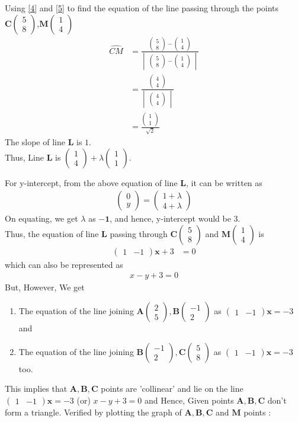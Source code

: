 \documentclass[journal,12pt,twocolumn]{IEEEtran}
\let\vec\mathbf
\newcommand{\mydet}[1]{\ensuremath{\begin{vmatrix}#1\end{vmatrix}}}
\newcommand{\myvec}[1]{\ensuremath{\begin{pmatrix}#1\end{pmatrix}}}
\begin{document}
\begin{enumerate}
Using \eqref{4} and \eqref{5} to find the equation of the line passing through the points $\vec{C}\myvec{5\\8}$,$\vec{M}\myvec{1\\4}$
\begin{align}
  \hat{CM} &= \frac{\myvec{5\\8} - \myvec{1\\4}}{\mydet{\myvec{5\\8} - \myvec{1\\4}}}\\
   &= \frac{\myvec{4\\4}}{\mydet{\myvec{4\\4}}}\\
   &= \frac{\myvec{1\\1}}{\sqrt{2}}
\end{align}
The slope of line $\vec{L}$ is $1$.
\\
Thus, Line $\vec{L}$ is $\myvec{1\\4} + \lambda\myvec{1\\1}$. 

 For y-intercept, from the above equation of line $\vec{L}$, it can be written as
 \begin{align}
     \myvec{0\\y} = \myvec{1+\lambda\\4+\lambda} 
 \end{align}
On equating, we get $\lambda$ as $\vec{-1}$, and hence, y-intercept would be $3$.
\\
Thus, the equation of line $\vec{L}$ passing through  $\vec{C}\myvec{5\\8}$ and $\vec{M}\myvec{1\\4}$ is 
\begin{align}
    \myvec{1 & - 1}\vec{x} + 3 &= 0
\end{align}
 which can also be represented as 
 \begin{align}
     x-y+3=0
 \end{align}
 \newpage
{\large But, However,}
We get
\newline
\begin{enumerate}
    \item The equation of the line joining $\vec{A}\myvec{2\\5}, \vec{B}\myvec{-1\\2}$ as $\myvec{1 & - 1}\vec{x} = -3$ and 
    \newline
    \item The equation of the line joining $\vec{B}\myvec{-1\\2}, \vec{C}\myvec{5\\8}$ as $\myvec{1 & - 1}\vec{x}=-3$ too.\newline
\end{enumerate}
 This implies that $\vec{A,B,C}$ points are 'collinear' and lie on the line $\myvec{1 & - 1}\vec{x} = -3$ (or) $x-y+3=0$ and Hence, Given points $\vec{A,B,C}$ don't form a triangle.
\newline
\large Verified by plotting the graph of $\vec{A,B,C}$ and $\vec{M}$ points :


\end{enumerate}
\end{document}
